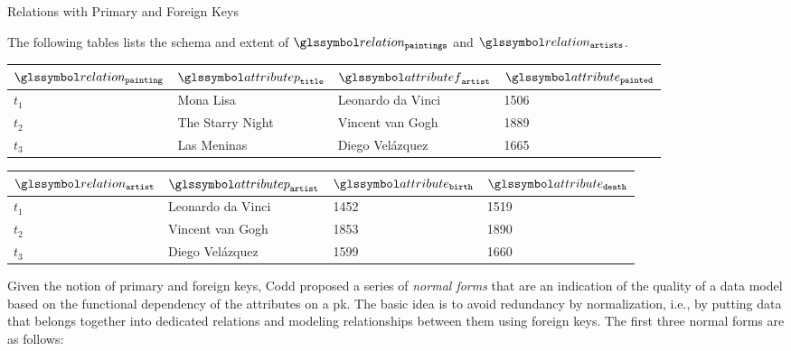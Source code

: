 \begin{example}[label=example:relational_table_pkfk]{Relations with Primary and Foreign Keys}{}
    
    The following tables lists the schema and extent of $\relation_{\mathtt{paintings}}$ and $\relation_{\mathtt{artists}}$.
    \begin{center}
        \begin{tabular}{ l || l | l | l |}
            $\relation_{\mathtt{painting}}$ & $\attributep_{\mathtt{title}}$  & $\attributef_{\mathtt{artist}}$  & $\attribute_{\mathtt{painted}}$ \\ 
            \hline
            \hline
            $t_1$ & Mona Lisa &  Leonardo da Vinci & 1506 \\
            \hline
            $t_2$ & The Starry Night & Vincent van Gogh & 1889 \\
            \hline
            $t_3$ & Las Meninas & Diego Velázquez & 1665 \\
            \hline
        \end{tabular}
    \end{center}

    \begin{center}
        \begin{tabular}{ l || l | l | l |}
            $\relation_{\mathtt{artist}}$ & $\attributep_{\mathtt{artist}}$ & $\attribute_{\mathtt{birth}}$ & $\attribute_{\mathtt{death}}$\\ 
            \hline
            \hline
            $t_1$ & Leonardo da Vinci & 1452 & 1519 \\
            \hline
            $t_2$ & Vincent van Gogh & 1853 & 1890 \\
            \hline
            $t_3$ & Diego Velázquez & 1599 & 1660 \\
            \hline
        \end{tabular}
    \end{center}
\end{example}

Given the notion of primary and foreign keys, Codd proposed a series of \emph{normal forms} that are an indication of the quality of a data model based on the functional dependency of the attributes on a \acrshort{pk}. The basic idea is to avoid redundancy by normalization, i.e., by putting data that belongs together into dedicated relations and modeling relationships between them using foreign keys. The first three normal forms are as follows:

